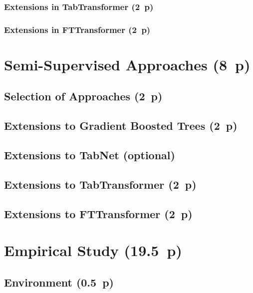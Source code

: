 \subsubsection{Extensions in
  TabTransformer (2~p)}\label{sec:extensions-in-tabtransformer}

  \subsubsection{Extensions in
  FTTransformer (2~p)}\label{sec:extensions-in-fttransformer}


\newpage
\section{Semi-Supervised Approaches (8~p)}\label{sec:semi-supervised-approaches}

\subsection{Selection of Approaches (2~p)}\label{sec:selection-of-approaches-1}

\subsection{Extensions to Gradient Boosted
  Trees (2~p)}\label{sec:extensions-to-gradient-boosted-trees}

\subsection{Extensions to TabNet (optional)}\label{sec:extensions-to-tabnet}

\subsection{Extensions to TabTransformer (2~p)}\label{sec:extensions-to-tabtransformer}

\subsection{Extensions to FTTransformer (2~p)}\label{sec:extensions-to-fttransformer}


\newpage
\section{Empirical Study (19.5~p)}\label{sec:empirical-study}

\subsection{Environment (0.5~p)}\label{sec:environment}

